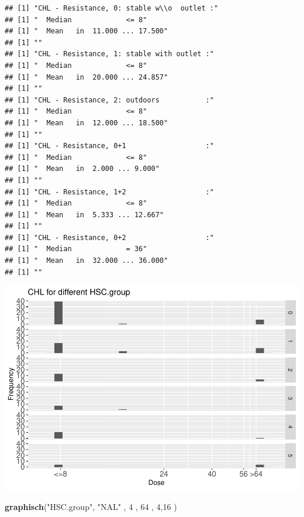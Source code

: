 \documentclass[
]{article}
\newenvironment{Shaded}{\begin{snugshade}}{\end{snugshade}}
\newcommand{\DecValTok}[1]{\textcolor[rgb]{0.00,0.00,0.81}{#1}}
\newcommand{\KeywordTok}[1]{\textcolor[rgb]{0.13,0.29,0.53}{\textbf{#1}}}
\newcommand{\NormalTok}[1]{#1}
\newcommand{\StringTok}[1]{\textcolor[rgb]{0.31,0.60,0.02}{#1}}
\begin{document}
\begin{verbatim}
## [1] "CHL - Resistance, 0: stable w\\o  outlet :"
## [1] "  Median             <= 8"
## [1] "  Mean   in  11.000 ... 17.500"
## [1] ""
## [1] "CHL - Resistance, 1: stable with outlet :"
## [1] "  Median             <= 8"
## [1] "  Mean   in  20.000 ... 24.857"
## [1] ""
## [1] "CHL - Resistance, 2: outdoors           :"
## [1] "  Median             <= 8"
## [1] "  Mean   in  12.000 ... 18.500"
## [1] ""
## [1] "CHL - Resistance, 0+1                   :"
## [1] "  Median             <= 8"
## [1] "  Mean   in  2.000 ... 9.000"
## [1] ""
## [1] "CHL - Resistance, 1+2                   :"
## [1] "  Median             <= 8"
## [1] "  Mean   in  5.333 ... 12.667"
## [1] ""
## [1] "CHL - Resistance, 0+2                   :"
## [1] "  Median             = 36"
## [1] "  Mean   in  32.000 ... 36.000"
## [1] ""
\end{verbatim}

\includegraphics{Verteilungen_files/figure-latex/unnamed-chunk-52-1.pdf}

\begin{Shaded}
\begin{Highlighting}[]
   \KeywordTok{graphisch}\NormalTok{(}\StringTok{"HSC.group"}\NormalTok{, }\StringTok{"NAL"}\NormalTok{ , }\DecValTok{4}\NormalTok{    ,  }\DecValTok{64}\NormalTok{   ,   }\DecValTok{4}\NormalTok{,}\DecValTok{16}\NormalTok{   ) }
\end{Highlighting}
\end{Shaded}
\end{document}
